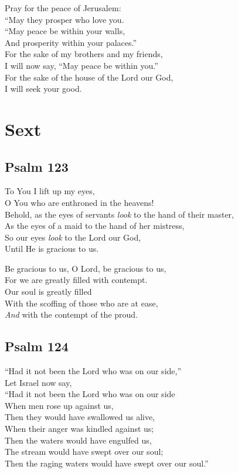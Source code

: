 \documentclass[14pt]{extbook}
\begin{document}
Pray for the peace of Jerusalem:\\
``May they prosper who love you.\\
``May peace be within your walls,\\
And prosperity within your palaces.''\\
For the sake of my brothers and my friends,\\
I will now say, ``May peace be within you.''\\
For the sake of the house of the Lord our God,\\
I will seek your good.

\newpage
\hypertarget{sext}{%
\section{Sext}\label{sext}}

\hypertarget{psalm-123}{%
\subsection{Psalm 123}\label{psalm-123}}

To You I lift up my eyes,\\
O You who are enthroned in the heavens!\\
Behold, as the eyes of servants \emph{look} to the hand of their
master,\\
As the eyes of a maid to the hand of her mistress,\\
So our eyes \emph{look} to the Lord our God,\\
Until He is gracious to us.

Be gracious to us, O Lord, be gracious to us,\\
For we are greatly filled with contempt.\\
Our soul is greatly filled\\
With the scoffing of those who are at ease,\\
\emph{And} with the contempt of the proud.

\hypertarget{psalm-124}{%
\subsection{Psalm 124}\label{psalm-124}}

``Had it not been the Lord who was on our side,''\\
Let Israel now say,\\
``Had it not been the Lord who was on our side\\
When men rose up against us,\\
Then they would have swallowed us alive,\\
When their anger was kindled against us;\\
Then the waters would have engulfed us,\\
The stream would have swept over our soul;\\
Then the raging waters would have swept over our soul.''
\end{document}

